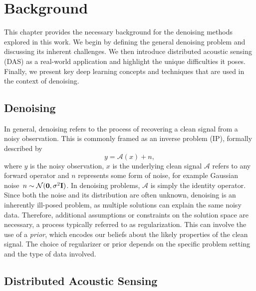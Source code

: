 \chapter{Background}

This chapter provides the necessary background for the denoising methods explored in this work.
We begin by defining the general denoising problem and discussing its inherent challenges.
We then introduce distributed acoustic sensing (DAS) as a real-world application and highlight the unique difficulties it poses.
Finally, we present key deep learning concepts and techniques that are used in the context of denoising.

\section{Denoising}\label{sec:denoising}

In general, denoising refers to the process of recovering a clean signal from a noisy observation.
This is commonly framed as an inverse problem (IP), formally described by
\begin{equation}
    y = \mathcal{A}(x) + n,
\end{equation}
where $y$ is the noisy observation, $x$ is the underlying clean signal $\mathcal{A}$ refers to any forward operator and $n$ represents some form of noise, for example Gaussian noise~$n \sim \normal$.
In denoising problems, $\mathcal{A}$ is simply the identity operator.
Since both the noise and its distribution are often unknown, denoising is an inherently ill-posed problem, as multiple solutions can explain the same noisy data.
Therefore, additional assumptions or constraints on the solution space are necessary, a process typically referred to as regularization.
This can involve the use of a \textit{prior}, which encodes our beliefs about the likely properties of the clean signal.
The choice of regularizer or prior depends on the specific problem setting and the type of data involved.

\section{Distributed Acoustic Sensing}\label{sec:DAS}


